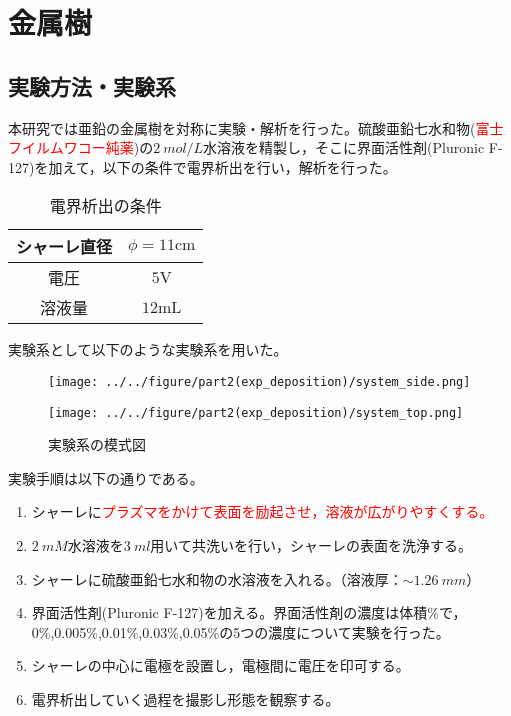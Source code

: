 \documentclass[autodetect-engine,dvi=dvipdfmx,a4paper,ja=standard,oneside,openany,11pt,draft]{bxjsarticle}
\begin{document}
\section{金属樹}
\subsection{実験方法・実験系}
本研究では亜鉛の金属樹を対称に実験・解析を行った。硫酸亜鉛七水和物(\textcolor{red}{富士フイルムワコー純薬})の$\SI{2}{mol/L}$水溶液を精製し，そこに界面活性剤(Pluronic F-127)を加えて，以下の条件で電界析出を行い，解析を行った。
\begin{table}[H]
  \centering
  \caption{電界析出の条件}
  \begin{tabular}{c||c}
    \hline
    シャーレ直径 & $\phi = 11 \si{\cm}$ \\ \hline
    電圧     & $5 \si{\V}$          \\ \hline
    溶液量    & $12 \si{\mL}$        \\
    \hline
  \end{tabular}
\end{table}
実験系として以下のような実験系を用いた。
\begin{figure}[H]
  \begin{minipage}
    {0.65\textwidth}
    \centering
    \texttt{[image: ../../figure/part2(exp\_deposition)/system\_side.png]}
    \label{fig:el_dep_mol}
  \end{minipage}
  \begin{minipage}
    {0.32\textwidth}
    \centering
    \texttt{[image: ../../figure/part2(exp\_deposition)/system\_top.png]}
    \label{fig:el_dep_fractal}
  \end{minipage}
  \caption{実験系の模式図}
\end{figure}
実験手順は以下の通りである。
\begin{enumerate}
  \item シャーレに\textcolor{red}{プラズマをかけて表面を励起させ，溶液が広がりやすくする。}
  \item {}$\SI{2}{mM}$水溶液を$\SI{3}{ml}$用いて共洗いを行い，シャーレの表面を洗浄する。
  \item シャーレに硫酸亜鉛七水和物の水溶液を入れる。（溶液厚：$\sim\SI{1.26}{mm}$）
  \item 界面活性剤(Pluronic F-127)を加える。界面活性剤の濃度は体積\%で，0\%,0.005\%,0.01\%,0.03\%,0.05\%の5つの濃度について実験を行った。
  \item シャーレの中心に電極を設置し，電極間に電圧を印可する。
  \item 電界析出していく過程を撮影し形態を観察する。
\end{enumerate}
\end{document}
